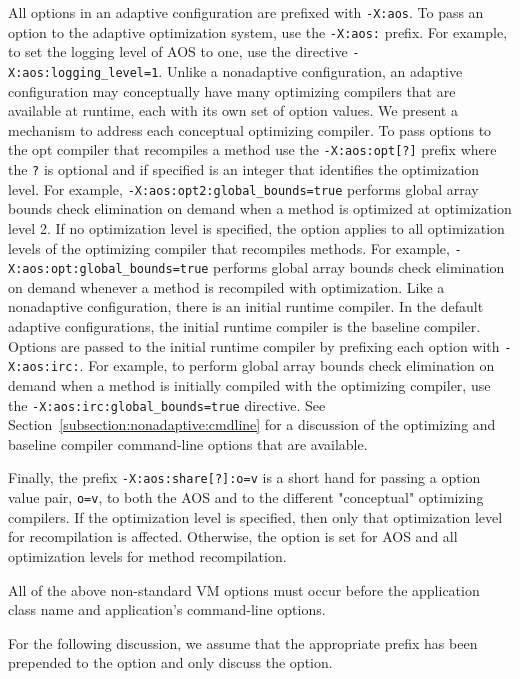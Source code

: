 All options in an adaptive configuration are prefixed with {\tt -X:aos}.
To pass an option to the adaptive optimization system, use the {\tt -X:aos:} 
prefix. 
For example, to set the logging level of AOS to one, use the directive
{\tt -X:aos:logging\_level=1}.
Unlike a nonadaptive configuration, an adaptive configuration may 
conceptually have many optimizing compilers that are available at runtime,
each with its own set of option values.
We present a mechanism to address each conceptual optimizing compiler.
To pass options to the opt compiler that recompiles a method
use the {\tt -X:aos:opt[?]} prefix where the {\tt ?} is optional and 
if specified is an integer that identifies the optimization level.
For example, {\tt -X:aos:opt2:global\_bounds=true} performs 
global array bounds check elimination on demand when a method is 
optimized at optimization level 2.
If no optimization level is specified, the option applies to all 
optimization levels of the optimizing compiler that recompiles methods.
For example, {\tt -X:aos:opt:global\_bounds=true} performs 
global array bounds check elimination on demand whenever a method is 
recompiled with optimization.
Like a nonadaptive configuration, there is an initial runtime compiler.
In the default adaptive configurations, the 
initial runtime compiler is the baseline compiler.
Options are passed to the initial runtime compiler
by prefixing each option with {\tt -X:aos:irc:}.
For example, to perform global array bounds check elimination on demand
when a method is initially compiled with the optimizing compiler,
use the {\tt -X:aos:irc:global\_bounds=true} directive.
See Section~\ref{subsection:nonadaptive:cmdline} for a discussion of the
optimizing and baseline compiler command-line options that are available.

Finally, the prefix {\tt -X:aos:share[?]:o=v} is a short hand for passing a
option value pair, {\tt o=v}, to both the AOS and to the different "conceptual"
optimizing compilers.  If the optimization level is specified, then only that 
optimization level for recompilation is affected.  Otherwise, the option is set
for AOS and all optimization levels for method recompilation.

All of the above non-standard VM options must occur before 
the application class name and application's command-line options.

For the following discussion, we assume that the appropriate prefix has been
prepended to the option and only discuss the option.

